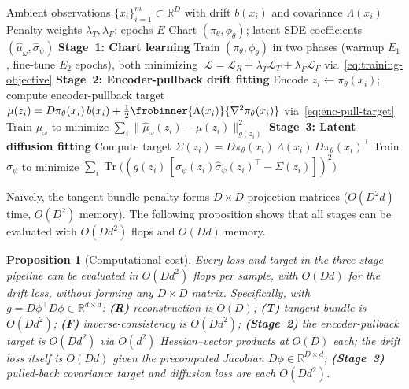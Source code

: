 \documentclass[11pt]{article}
\newcommand{\R}{\mathbb{R}}
\newcommand{\cL}{\mathcal{L}}
\newcommand{\RD}{\mathbb{R}^D}
\newcommand{\tr}{\operatorname{Tr}}
\newcommand{\norm}[1]{\lVert#1\rVert}
\newtheorem{prop}[thm]{Proposition}
\begin{document}
\begin{algorithm}[t]
\caption{Three-stage pipeline: geometric chart learning and latent SDE estimation}
\label{alg:pipeline}
\begin{algorithmic}[1]
\REQUIRE Ambient observations $\{x_i\}_{i=1}^m\subset\RD$ with
  drift $b(x_i)$ and covariance $\Lambda(x_i)$
\REQUIRE Penalty weights $\lambda_T,\lambda_F$;
  epochs $E$
\ENSURE Chart $(\pi_\theta,\phi_\theta)$; latent SDE coefficients
  $(\hat\mu_\omega,\hat\sigma_\psi)$
\STATE \textbf{Stage~1: Chart learning} 
\STATE Train $(\pi_\theta,\phi_\theta)$ in two phases
  (warmup $E_1$, fine-tune $E_2$ epochs),
  both minimizing
  $\;\cL=\cL_R+\lambda_T\cL_T+\lambda_F\cL_F$
  via~\eqref{eq:training-objective}
\STATE \textbf{Stage~2: Encoder-pullback drift fitting} 
\STATE Encode $z_i\gets\pi_\theta(x_i)$; compute encoder-pullback target
  $\mu(z_i) = D\pi_\theta(x_i)\,b(x_i) + \tfrac{1}{2}\frobinner{\Lambda(x_i)}{\nabla^2\pi_\theta(x_i)}$
  via~\eqref{eq:enc-pull-target}
\STATE Train $\hat\mu_\omega$ to minimize
  $\sum_i\norm{\hat\mu_\omega(z_i)-\mu(z_i)}_{g(z_i)}^2$
\STATE \textbf{Stage~3: Latent diffusion fitting} 
\STATE Compute target $\Sigma(z_i) = D\pi_\theta(x_i)\,\Lambda(x_i)\,D\pi_\theta(x_i)^\top$
\STATE Train $\hat\sigma_\psi$ to minimize
  $\sum_i\tr\bigl((g(z_i)\,[\hat\sigma_\psi(z_i)\hat\sigma_\psi(z_i)^\top - \Sigma(z_i)])^2\bigr)$
\end{algorithmic}
\end{algorithm}

Na\"ively, the tangent-bundle penalty forms $D\times D$ projection
matrices ($O(D^2 d)$ time, $O(D^2)$ memory).
The following proposition shows that all stages can be evaluated
with $O(Dd^2)$ flops and $O(Dd)$ memory.

\begin{prop}[Computational cost]\label{prop:efficient-tangent}%
\label{prop:hessian-free}
  Every loss and target in the three-stage pipeline
 can be evaluated in $O(Dd^2)$
  flops per sample, with $O(Dd)$ for the drift loss, without
  forming any $D\times D$ matrix.
  Specifically, with $g=D\phi^\top D\phi\in\R^{d\times d}$:
  \textbf{(R)} reconstruction is $O(D)$;
  \textbf{(T)} tangent-bundle is $O(Dd^2)$;
  \textbf{(F)} inverse-consistency is $O(Dd^2)$;
  \textbf{(Stage~2)} the encoder-pullback target is $O(Dd^2)$
  via $O(d^2)$ Hessian--vector products at $O(D)$ each;
  the drift loss itself is $O(Dd)$ given
  the precomputed Jacobian $D\phi\in\R^{D\times d}$;
  \textbf{(Stage~3)} pulled-back covariance target and
  diffusion loss are each $O(Dd^2)$.
\end{prop}
\end{document}
